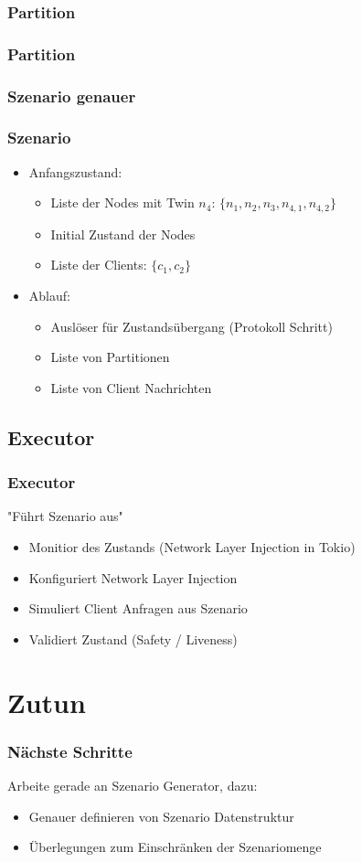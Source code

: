 \documentclass{beamer}
\begin{document}
\subsubsection{Partition}
\begin{frame}
\frametitle{Partition}
\end{frame}
\subsubsection{Szenario genauer}
\begin{frame}
 \frametitle{Szenario}
 \begin{itemize}
  \item Anfangszustand:
  \begin{itemize}
   \item Liste der Nodes mit Twin $n_4$: $\{n_1,n_2,n_3,n_{4,1},n_{4,2}\}$

   \item Initial Zustand der Nodes
   \item Liste der Clients: $\{c_1,c_2\}$
  \end{itemize}
  \item Ablauf:
  \begin{itemize}
   \item Auslöser für Zustandsübergang (Protokoll Schritt)
   \item Liste von Partitionen
   \item Liste von Client Nachrichten
  \end{itemize}

 \end{itemize}
\end{frame}

\subsection{Executor}
\begin{frame}
\frametitle{Executor}
"Führt Szenario aus"
 \begin{itemize}
  \item Monitior des Zustands (Network Layer Injection in Tokio)
  \item Konfiguriert Network Layer Injection
  \item Simuliert Client Anfragen aus Szenario
  \item Validiert Zustand (Safety / Liveness)
 \end{itemize}
\end{frame}

\section{Zutun}
\begin{frame}
\frametitle{Nächste Schritte}
Arbeite gerade an Szenario Generator, dazu:
 \begin{itemize}
  \item Genauer definieren von Szenario Datenstruktur
  \item Überlegungen zum Einschränken der Szenariomenge
 \end{itemize}
\end{frame}
\end{document}
